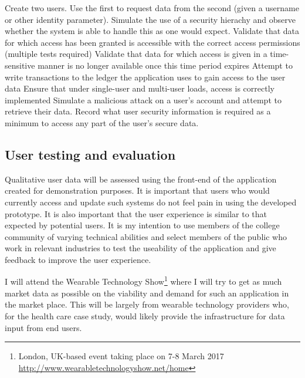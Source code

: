 \begin{outline}
  \1 Create two users. Use the first to request data from the second (given a username or other identity parameter).
  \1 Simulate the use of a security hierachy and observe whether the system is able to handle this as one would expect.
  \1 Validate that data for which access has been granted is accessible with the correct access permissions (multiple tests required)
  \1 Validate that data for which access is given in a time-sensitive manner is no longer available once this time period expires
  \1 Attempt to write transactions to the ledger the application uses to gain access to the user data
  \1 Ensure that under single-user and multi-user loads, access is correctly implemented
  \1 Simulate a malicious attack on a user's account and attempt to retrieve their data. Record what user security information is required as a minimum to access any part of the user's secure data.
\end{outline}

\subsection{User testing and evaluation}

Qualitative user data will be assessed using the front-end of the application created for demonstration purposes. It is important that users who would currently access and update such systems do not feel pain in using the developed prototype. It is also important that the user experience is similar to that expected by potential users. It is my intention to use members of the college community of varying technical abilities and select members of the public who work in relevant industries to test the useability of the application and give feedback to improve the user experience.

I will attend the Wearable Technology Show\footnote{London, UK-based event taking place on 7-8 March 2017 \url{http://www.wearabletechnologyshow.net/home}} where I will try to get as much market data as possible on the viability and demand for such an application in the market place. This will be largely from wearable technology providers who, for the health care case study, would likely provide the infrastructure for data input from end users.



